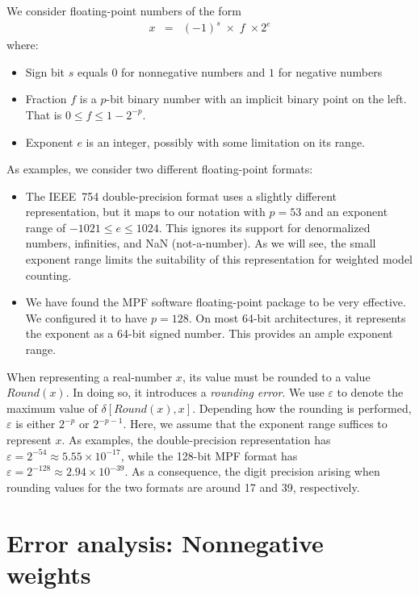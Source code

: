 \documentclass[letterpaper,USenglish,cleveref, autoref, thm-restate]{lipics-v2021}
\newcommand{\round}{\mathit{Round}}
\newcommand{\aerror}{\delta}
\newcommand{\roundepsilon}{\varepsilon}
\begin{document}
We consider floating-point numbers of the form
\begin{eqnarray}
x & = & (-1)^s \; \times \; f \; \times 2^{e} \label{eqn:floating-point}
\end{eqnarray}
where:
\begin{itemize}
\item Sign bit $s$ equals $0$ for nonnegative numbers and $1$ for negative numbers
\item Fraction $f$ is a $p$-bit binary number with an implicit binary point on the left.  That is $0 \leq f \leq 1-2^{-p}$.
\item Exponent $e$ is an integer, possibly with some limitation on its range.
\end{itemize}
As examples, we consider two different floating-point formats:
\begin{itemize}
\item The IEEE~754 double-precision format uses a slightly different representation, but it maps to our notation with $p=53$ and an exponent range of
  $-1021 \leq e \leq 1024$.  This ignores its support for denormalized numbers, infinities, and NaN (not-a-number).  As we will see, the small exponent range limits the suitability of
  this representation for weighted model counting.
\item We have found the MPF software floating-point package to be very effective.  We configured it to have $p=128$. On most 64-bit architectures, it represents
  the exponent as a 64-bit signed number.  This provides an ample exponent range.
\end{itemize}

When representing a real-number $x$, its value must be rounded to a
value $\round(x)$.  In doing so, it introduces a \emph{rounding
error}.  We use $\roundepsilon$ to denote the maximum value of
$\aerror[\round(x), x]$.  Depending how the rounding
is performed, $\roundepsilon$ is either $2^{-p}$ or $2^{-p-1}$.  Here, we assume that the exponent range suffices to represent $x$.
As examples, the double-precision representation has $\roundepsilon = 2^{-54} \approx 5.55 \times 10^{-17}$, while the 128-bit MPF format
has $\roundepsilon = 2^{-128} \approx 2.94 \times 10^{-39}$.  As a consequence, the digit precision arising when rounding values for the two formats are around 17 and 39, respectively.

\section{Error analysis: Nonnegative weights}
\end{document}
